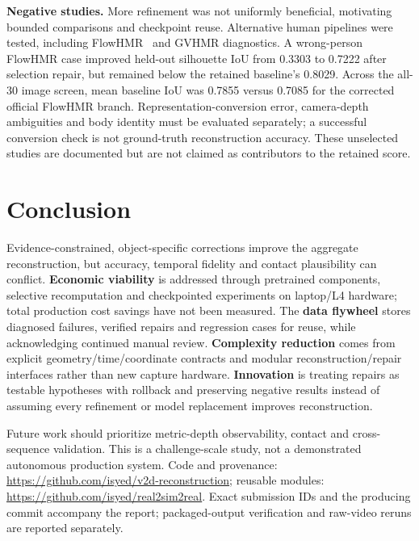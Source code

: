 \documentclass[10pt]{nvidiaextabstract}
\begin{document}
\textbf{Negative studies.}
More refinement was not uniformly beneficial, motivating bounded comparisons
and checkpoint reuse. Alternative human pipelines were tested, including
FlowHMR~\cite{flowhmr} and GVHMR diagnostics. A wrong-person FlowHMR case
improved held-out silhouette IoU from 0.3303 to 0.7222 after selection repair,
but remained below the retained baseline's 0.8029. Across the all-30 image
screen, mean baseline IoU was 0.7855 versus 0.7085 for the corrected official
FlowHMR branch. Representation-conversion error, camera-depth ambiguities
and body identity must be evaluated separately; a successful conversion
check is not ground-truth reconstruction accuracy. These unselected studies
are documented but are not claimed as contributors to the retained score.

\section{Conclusion}
Evidence-constrained, object-specific corrections improve the aggregate
reconstruction, but accuracy, temporal fidelity and contact plausibility can
conflict. \textbf{Economic viability} is addressed through pretrained components,
selective recomputation and checkpointed experiments on laptop/L4 hardware;
total production cost savings have not been measured.
The \textbf{data flywheel} stores diagnosed failures, verified repairs and
regression cases for reuse, while acknowledging continued manual review.
\textbf{Complexity reduction} comes from explicit geometry/time/coordinate
contracts and modular reconstruction/repair interfaces rather than new capture
hardware. \textbf{Innovation} is treating repairs as testable hypotheses with
rollback and preserving negative results instead of assuming every refinement
or model replacement improves reconstruction.

Future work should prioritize metric-depth observability, contact and
cross-sequence validation. This is a challenge-scale study, not a demonstrated
autonomous production system. Code and provenance:
\url{https://github.com/isyed/v2d-reconstruction}; reusable modules:
\url{https://github.com/isyed/real2sim2real}. Exact submission IDs and the
producing commit accompany the report; packaged-output verification and
raw-video reruns are reported separately.


\end{document}
